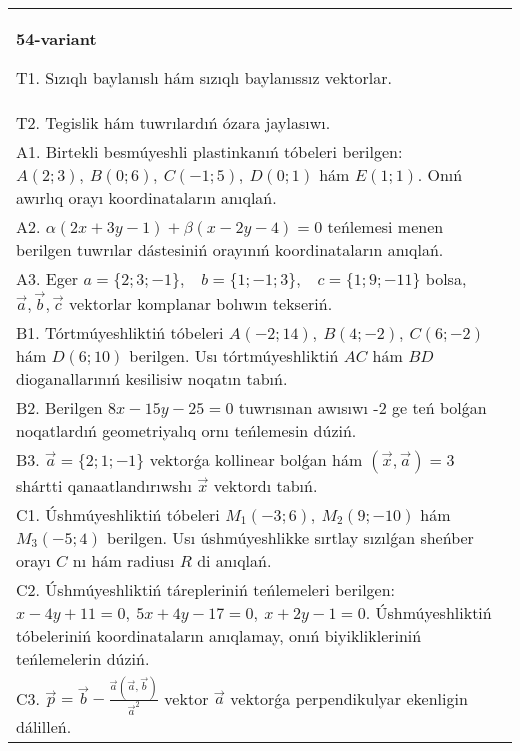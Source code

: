 \documentclass{article}
\begin{document}
    
    \begin{tabular}{m{17cm}}
    \textbf{54-variant}
    \newline
    
    T1. 
    Sızıqlı baylanıslı hám sızıqlı baylanıssız vektorlar.
     \\
    T2. 
    Tegislik hám tuwrılardıń ózara jaylasıwı.
     \\
    A1. 
    Birtekli besmúyeshli plastinkanıń tóbeleri berilgen:
    $A(2;3), \ B(0;6), \ C(-1;5), \ D(0;1)$ hám $E(1;1)$. Onıń awırlıq
    orayı koordinataların anıqlań.
     \\
    A2. 
    $\alpha(2x+3y-1)+\beta(x-2y-4)=0$ teńlemesi
    menen berilgen tuwrılar dástesiniń orayınıń koordinataların anıqlań.
     \\
    A3. 
    Eger \(a = \{ 2;3; - 1\},\ \ \ \ b = \{ 1; - 1;3\},\ \ \ \ c = \{ 1;9; - 11\}\) bolsa, $\overrightarrow{a}, \overrightarrow{b}, \overrightarrow{c}$ vektorlar komplanar bolıwın tekseriń.
     \\
    B1. 
    Tórtmúyeshliktiń tóbeleri
    \(A(-2;14),\ B(4;-2),\ C(6;-2)\) hám \(D(6;10)\) berilgen. Usı
    tórtmúyeshliktiń $AC$ hám $BD$ dioganallarınıń kesilisiw
    noqatın tabıń.
     \\
    B2. 
    Berilgen \(8x-15y-25=0\) tuwrısınan awısıwı -2 ge
    teń bolǵan noqatlardıń geometriyalıq ornı teńlemesin dúziń.
     \\
    B3. 
    $\vec{a} = \{ 2;1; - 1\}$ vektorǵa kollinear bolǵan hám $\left(\vec{x},\vec{a} \right) = 3$ shártti qanaatlandırıwshı $\vec{x}$ vektordı tabıń.
     \\
    C1. 
    Úshmúyeshliktiń tóbeleri \(M_{1}( - 3;6),\ M_{2}(9; - 10)\) 
    hám \(M_{3}( - 5;4)\) berilgen. Usı úshmúyeshlikke sırtlay sızılǵan
    sheńber orayı $C$ nı hám radiusı $R$ di anıqlań.
     \\
    C2. 
    Úshmúyeshliktiń tárepleriniń teńlemeleri berilgen:
    \(x - 4y + 11 = 0,\ 5x + 4y - 17 = 0,\ x + 2y - 1 = 0.\) 
    Úshmúyeshliktiń tóbeleriniń koordinataların anıqlamay, onıń
    biyiklikleriniń teńlemelerin dúziń.
     \\
    C3. 
    \(\vec{p} = \vec{b} - \frac{\vec{a} (\vec{a},\vec{b}) }{{\vec{a}}^{2}}\) vektor \(\vec{a}\) vektorǵa perpendikulyar ekenligin dálilleń.
     \\
    
    \end{tabular}
    \vspace{1cm}
    
\end{document}
